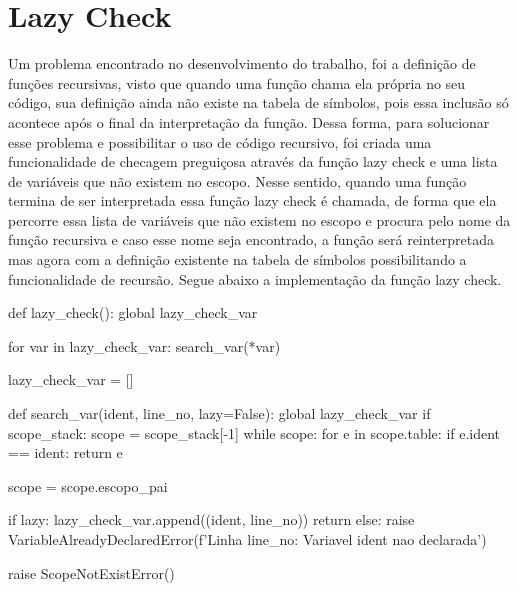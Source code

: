 \documentclass[
	12pt,				%
	openright,			%
	twoside,			%
	a4paper,			%
	english,			%
	french,				%
	spanish,			%
	brazil				%
	]{abntex2}
\begin{document}
\section{Lazy Check}
Um problema encontrado no desenvolvimento do trabalho, foi a definição de funções recursivas, visto que quando uma função chama ela própria no seu código, sua definição ainda não existe na tabela de símbolos, pois essa inclusão só acontece após o final da interpretação da função. Dessa forma, para solucionar esse problema e possibilitar o uso de código recursivo, foi criada uma funcionalidade de checagem preguiçosa através da função lazy check e uma lista de variáveis que não existem no escopo. Nesse sentido, quando uma função termina de ser interpretada essa função lazy check é chamada, de forma que ela percorre essa lista de variáveis que não existem no escopo e procura pelo nome da função recursiva e caso esse nome seja encontrado, a função será reinterpretada mas agora com a definição existente na tabela de símbolos possibilitando a funcionalidade de recursão.
Segue abaixo a implementação da função lazy check.

\begin{python}
def lazy_check():
    global lazy_check_var
  
    for var in lazy_check_var:
        search_var(*var)
  
    lazy_check_var = []

def search_var(ident, line_no, lazy=False):
    global lazy_check_var
    if scope_stack:
        scope = scope_stack[-1]
        while scope:
            for e in scope.table:
                if e.ident == ident:
                    return e
            
            scope = scope.escopo_pai
        
        if lazy:
            lazy_check_var.append((ident, line_no))
            return
        else:
            raise VariableAlreadyDeclaredError(f'Linha {line_no}: Variavel {ident} nao declarada')

    raise ScopeNotExistError()
\end{python}
\end{document}
